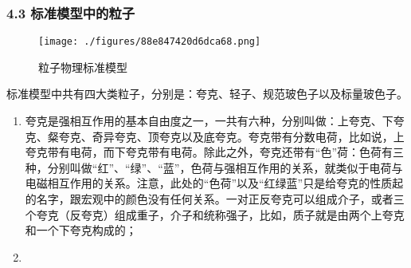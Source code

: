 \subsubsection{4.3 标准模型中的粒子}
\begin{figure}[ht]
\centering
\texttt{[image: ./figures/88e847420d6dca68.png]}
\caption{粒子物理标准模型} \label{fig_LZWLX_1}
\end{figure}
标准模型中共有四大类粒子，分别是：夸克、轻子、规范玻色子以及标量玻色子。
\begin{enumerate}
\item 夸克是强相互作用的基本自由度之一，一共有六种，分别叫做：上夸克、下夸克、粲夸克、奇异夸克、顶夸克以及底夸克。夸克带有分数电荷，比如说，上夸克带有电荷，而下夸克带有电荷。除此之外，夸克还带有“色”荷：色荷有三种，分别叫做“红”、“绿”、“蓝”，色荷与强相互作用的关系，就类似于电荷与电磁相互作用的关系。注意，此处的“色荷”以及“红绿蓝”只是给夸克的性质起的名字，跟宏观中的颜色没有任何关系。一对正反夸克可以组成介子，或者三个夸克（反夸克）组成重子，介子和统称强子，比如，质子就是由两个上夸克和一个下夸克构成的；
\item 
\end{enumerate}
